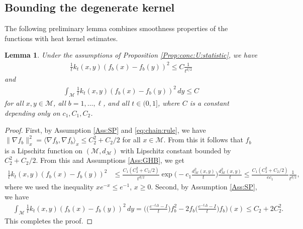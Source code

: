 \documentclass[10pt]{article}
\theoremstyle{plain}
\newtheorem{lemma}{Lemma}
\theoremstyle{definition}
\theoremstyle{remark}
\begin{document}
\subsection{Bounding the degenerate kernel}

The following preliminary lemma combines smoothness properties of the functions with heat kernel estimates.

\begin{lemma}\label{lemma:bound:kernel:smoothness}
    Under the assumptions of Proposition \ref{Prop:conc:U:statistic}, we have 
    \begin{align*}
        \frac{1}{t}k_t(x,y)(f_b(x)-f_b(y))^2\leq C\frac{1}{t^{d/2}}
    \end{align*}
    and
    \begin{align*}
        \int_{\mathcal{M}}\frac{1}{t}k_t(x,y)(f_b(x)-f_b(y))^2\,dy\leq C
    \end{align*}
    for all $x,y\in\mathcal{M}$, all $b=1,\dots,\ell$, and all $t\in(0,1]$, where $C$ is a constant depending only on $c_1,C_1,C_2$.
\end{lemma}

\begin{proof}
    First, by Assumption \ref{Ass:SP} and \eqref{eq:chain:rule}, we have $\|\nabla f_b\|_x^2=\langle \nabla f_b,\nabla f_b\rangle_x\leq C_2^2+C_2/2$ for all $x\in\mathcal{M}$. From this it follows that $f_b$ is a Lipschitz function on $(\mathcal{M},d_{\mathcal{M}})$ with Lipschitz constant bounded by $C_2^2+C_2/2$.
    From this and Assumptions \ref{Ass:GHB}, we get
    \begin{align*}
        \frac{1}{t}k_t(x,y)(f_b(x)-f_b(y))^2&\leq \frac{C_1(C_2^2+C_2/2)}{t^{d/2}}\exp\Big(-c_1\frac{d_{\mathcal{M}}^2(x,y)}{t}\Big)\frac{d_{\mathcal{M}}^2(x,y)}{t}\leq \frac{C_1(C_2^2+C_2/2)}{ec_1}\frac{1}{t^{d/2}},
    \end{align*}
    where we used the inequality $xe^{-x}\leq e^{-1}$, $x\geq 0$. Second, by Assumption \ref{Ass:SP}, we have
    \begin{align*}
        &\int_{\mathcal{M}}\frac{1}{t}k_t(x,y)(f_b(x)-f_b(y))^2\,dy=\Big(\Big(\frac{e^{-t\Delta}-I}{t}\Big)f_b^2-2f_b\Big(\frac{e^{-t\Delta}-I}{t}\Big)f_b\Big)(x)\leq C_2+2C_2^2.
    \end{align*} 
    This completes the proof.
\end{proof}
\end{document}
